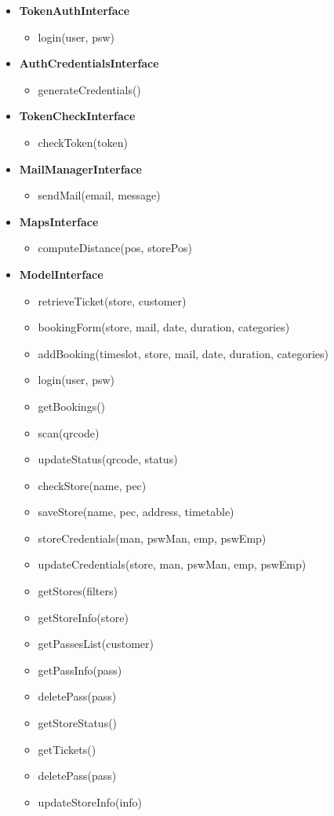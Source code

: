 \begin{itemize}
	\item \textbf{TokenAuthInterface}
	\begin{itemize}
		\item login(user, psw)
	\end{itemize}

	\item \textbf{AuthCredentialsInterface}
	\begin{itemize}
		\item generateCredentials()
	\end{itemize}

	\item \textbf{TokenCheckInterface}
	\begin{itemize}
		\item checkToken(token)
	\end{itemize}

	\clearpage

	\item \textbf{MailManagerInterface}
	\begin{itemize}
		\item sendMail(email, message)
	\end{itemize}

	\item \textbf{MapsInterface}
	\begin{itemize}
		\item computeDistance(pos, storePos)
	\end{itemize}

	\item \textbf{ModelInterface}
	\begin{itemize}
		\item retrieveTicket(store, customer)
		\item bookingForm(store, mail, date, duration, categories)
		\item addBooking(timeslot, store, mail, date, duration, categories)
		\item login(user, psw)
		\item getBookings()
		\item scan(qrcode)
		\item updateStatus(qrcode, status)
		\item checkStore(name, pec)
		\item saveStore(name, pec, address, timetable)
		\item storeCredentials(man, pswMan, emp, pswEmp)
		\item updateCredentials(store, man, pswMan, emp, pswEmp)
		\item getStores(filters)
		\item getStoreInfo(store)
		\item getPassesList(customer)
		\item getPassInfo(pass)
		\item deletePass(pass)
		\item getStoreStatus()
		\item getTickets()
		\item deletePass(pass)
		\item updateStoreInfo(info)
	\end{itemize}


\end{itemize}
